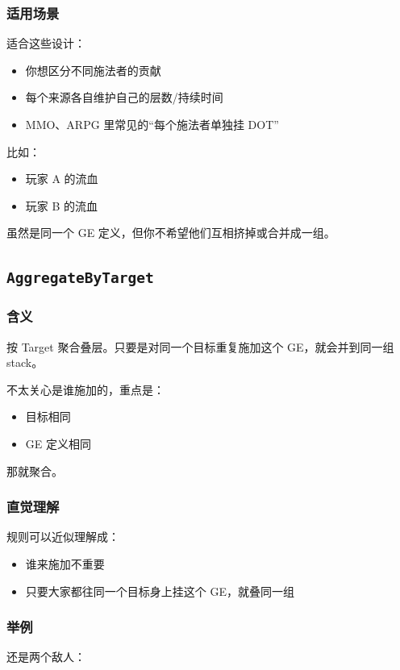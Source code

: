 \subsubsection*{适用场景}
适合这些设计：

\begin{itemize}
	\item 你想区分不同施法者的贡献
	\item 每个来源各自维护自己的层数/持续时间
	\item MMO、ARPG 里常见的“每个施法者单独挂 DOT”
\end{itemize}

比如：

\begin{itemize}
	\item 玩家 A 的流血
	\item 玩家 B 的流血
\end{itemize}

虽然是同一个 GE 定义，但你不希望他们互相挤掉或合并成一组。

\subsection{\texttt{AggregateByTarget}}

\subsubsection*{含义}
按 Target 聚合叠层。只要是对同一个目标重复施加这个 GE，就会并到同一组 stack。

不太关心是谁施加的，重点是：

\begin{itemize}
	\item 目标相同
	\item GE 定义相同
\end{itemize}

那就聚合。

\subsubsection*{直觉理解}
规则可以近似理解成：

\begin{itemize}
	\item 谁来施加不重要
	\item 只要大家都往同一个目标身上挂这个 GE，就叠同一组
\end{itemize}

\subsubsection*{举例}
还是两个敌人：


